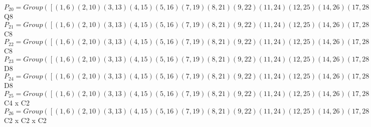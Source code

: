 \documentclass[varwidth=\maxdimen,border=10]{standalone}
\begin{document}
\begin{tabular}
$P_{20} = Group( [ ( 1, 6)( 2,10)( 3,13)( 4,15)( 5,16)( 7,19)( 8,21)( 9,22)(11,24)(12,25)(14,26)(17,28)(18,29)(20,30)(23,31)(27,32), ( 1, 5, 6,16)( 2, 9,10,22)( 3,12,13,25)( 4,14,15,26)( 7,18,19,29)( 8,20,21,30)(11,23,24,31)(17,27,28,32), ( 1,21, 6, 8)( 2,15,10, 4)( 3,32,13,27)( 5,20,16,30)( 7,31,19,23)( 9,14,22,26)(11,18,24,29)(12,28,25,17) ] )\cong$ Q8\ \\
$P_{21} = Group( [ ( 1, 6)( 2,10)( 3,13)( 4,15)( 5,16)( 7,19)( 8,21)( 9,22)(11,24)(12,25)(14,26)(17,28)(18,29)(20,30)(23,31)(27,32), ( 1, 5, 6,16)( 2, 9,10,22)( 3,12,13,25)( 4,14,15,26)( 7,18,19,29)( 8,20,21,30)(11,23,24,31)(17,27,28,32), ( 1,18, 5,19, 6,29,16, 7)( 2,12, 9,13,10,25,22, 3)( 4,32,14,17,15,27,26,28)( 8,31,20,11,21,23,30,24) ] )\cong$ C8\ \\
$P_{22} = Group( [ ( 1, 6)( 2,10)( 3,13)( 4,15)( 5,16)( 7,19)( 8,21)( 9,22)(11,24)(12,25)(14,26)(17,28)(18,29)(20,30)(23,31)(27,32), ( 1, 5, 6,16)( 2, 9,10,22)( 3,12,13,25)( 4,14,15,26)( 7,18,19,29)( 8,20,21,30)(11,23,24,31)(17,27,28,32), ( 1,32,16,28, 6,27, 5,17)( 2,31,22,24,10,23, 9,11)( 3,21,25,20,13, 8,12,30)( 4,18,26, 7,15,29,14,19) ] )\cong$ C8\ \\
$P_{23} = Group( [ ( 1, 6)( 2,10)( 3,13)( 4,15)( 5,16)( 7,19)( 8,21)( 9,22)(11,24)(12,25)(14,26)(17,28)(18,29)(20,30)(23,31)(27,32), ( 1,14, 6,26)( 2,20,10,30)( 3,23,13,31)( 4, 5,15,16)( 7,27,19,32)( 8, 9,21,22)(11,12,24,25)(17,18,28,29), ( 1, 3)( 2, 7)( 4,11)( 5,25)( 6,13)( 8,17)( 9,29)(10,19)(12,16)(14,31)(15,24)(18,22)(20,32)(21,28)(23,26)(27,30) ] )\cong$ D8\ \\
$P_{24} = Group( [ ( 1, 6)( 2,10)( 3,13)( 4,15)( 5,16)( 7,19)( 8,21)( 9,22)(11,24)(12,25)(14,26)(17,28)(18,29)(20,30)(23,31)(27,32), ( 1, 4)( 2, 8)( 3,11)( 5,14)( 6,15)( 7,17)( 9,20)(10,21)(12,23)(13,24)(16,26)(18,27)(19,28)(22,30)(25,31)(29,32), ( 1, 2)( 3,18)( 4,21)( 5,22)( 6,10)( 7,12)( 8,15)( 9,16)(11,32)(13,29)(14,20)(17,31)(19,25)(23,28)(24,27)(26,30) ] )\cong$ D8\ \\
$P_{25} = Group( [ ( 1, 6)( 2,10)( 3,13)( 4,15)( 5,16)( 7,19)( 8,21)( 9,22)(11,24)(12,25)(14,26)(17,28)(18,29)(20,30)(23,31)(27,32), ( 1,14, 6,26)( 2,20,10,30)( 3,23,13,31)( 4, 5,15,16)( 7,27,19,32)( 8, 9,21,22)(11,12,24,25)(17,18,28,29), ( 1, 2)( 3,18)( 4,21)( 5,22)( 6,10)( 7,12)( 8,15)( 9,16)(11,32)(13,29)(14,20)(17,31)(19,25)(23,28)(24,27)(26,30) ] )\cong$ C4 x C2\ \\
$P_{26} = Group( [ ( 1, 6)( 2,10)( 3,13)( 4,15)( 5,16)( 7,19)( 8,21)( 9,22)(11,24)(12,25)(14,26)(17,28)(18,29)(20,30)(23,31)(27,32), ( 1, 4)( 2, 8)( 3,11)( 5,14)( 6,15)( 7,17)( 9,20)(10,21)(12,23)(13,24)(16,26)(18,27)(19,28)(22,30)(25,31)(29,32), ( 1, 3)( 2, 7)( 4,11)( 5,25)( 6,13)( 8,17)( 9,29)(10,19)(12,16)(14,31)(15,24)(18,22)(20,32)(21,28)(23,26)(27,30) ] )\cong$ C2 x C2 x C2\ \\

\end{tabular}
\end{document}

